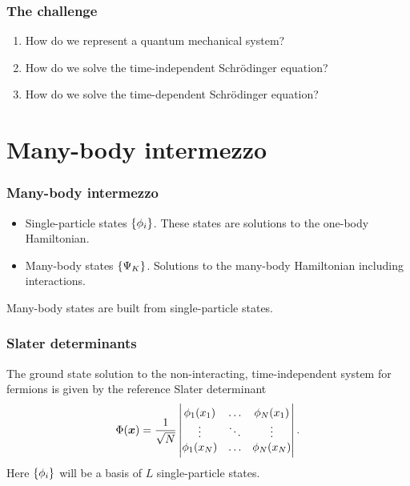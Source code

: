 \documentclass{beamer}
\begin{document}
\begin{frame}
    \frametitle{The challenge}
    \begin{enumerate}
        \item How do we represent a quantum mechanical system?
        \item How do we solve the time-independent Schrödinger equation?
        \item How do we solve the time-dependent Schrödinger equation?
    \end{enumerate}
\end{frame}

\section{Many-body intermezzo}

\begin{frame}
    \frametitle{Many-body intermezzo}
    \begin{itemize}
        \item Single-particle states $\left\{ \phi_i \right\}$.
            These states are solutions to the one-body Hamiltonian.
        \item Many-body states $\left\{ \Psi_K \right\}$.
            Solutions to the many-body Hamiltonian including interactions.
    \end{itemize}
    Many-body states are built from single-particle states.
\end{frame}


\begin{frame}
    \frametitle{Slater determinants}
    The ground state solution to the non-interacting, time-independent system
    for fermions is given by the reference Slater determinant
    \begin{align}
        \Phi(\boldsymbol{x})
        = \frac{1}{\sqrt{N}}
        \begin{vmatrix}
            \phi_1(x_1) & \dots & \phi_N(x_1) \\
            \vdots & \ddots & \vdots \\
            \phi_1(x_N) & \dots & \phi_N(x_N)
        \end{vmatrix}.
    \end{align}
    Here $\left\{ \phi_i \right\}$ will be a basis of $L$ single-particle states.
\end{frame}
\end{document}
